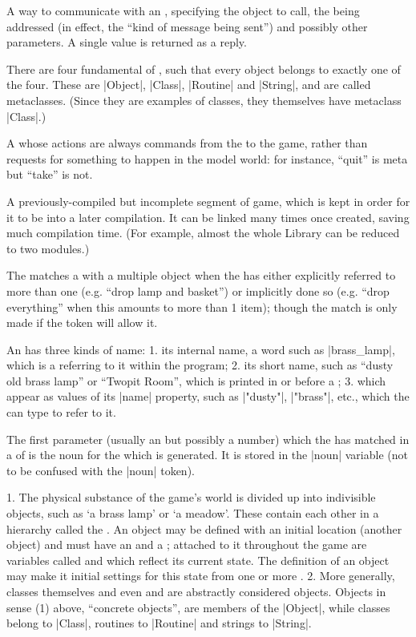 %
A way to communicate with an , specifying the object to call,
the  being addressed (in effect, the ``kind of message being
sent'') and possibly other parameters.  A single value is returned as
a reply.

%
There are four fundamental  of , such that every object
belongs to exactly one of the four.  These are |Object|, |Class|, |Routine|
and |String|, and are called metaclasses.  (Since they are examples of
classes, they themselves have metaclass |Class|.)

%
A  whose actions are always commands from the  to the game,
rather than requests for something to happen in the model world: for
instance, ``quit'' is meta but ``take'' is not.

%
A previously-compiled but incomplete segment of game, which is kept in
order for it to be  into a later compilation.  It can be
linked many times once created, saving much compilation time.  (For
example, almost the whole Library can be reduced to two modules.)

%
The  matches a  with a multiple object when the 
has either explicitly referred to more than one  (e.g. ``drop
lamp and basket'') or implicitly done so (e.g. ``drop everything'' when
this amounts to more than 1 item); though the match is only made if the
token will allow it.

%
An  has three kinds of name: 1. its internal name, a word such
as |brass_lamp|, which is a  referring to it within the program;
2. its short name, such as ``dusty old brass lamp'' or ``Twopit Room'',
which is printed in  or before a ; 3.
 which appear as values of its |name| property, such
as |"dusty"|, |"brass"|, etc., which the  can type to refer to it.

%
The first parameter (usually an  but possibly a number) which
the  has matched in a  of  is the noun for
the  which is generated.  It is stored in the |noun| variable
(not to be confused with the |noun| token).

%
1. The physical substance of the game's world is divided up into indivisible
objects, such as `a brass lamp' or `a meadow'.  These contain each other
in a hierarchy called the .  An object may be defined with an
initial location (another object) and must have an  and
a ; attached to it throughout the game are variables called
 and  which reflect its current state.  The
definition of an object may make it  initial settings for this
state from one or more .  2. More generally, classes themselves
and even  and  are abstractly considered objects.
Objects in sense (1) above, ``concrete objects'', are members of the
 |Object|, while classes belong to |Class|, routines to
|Routine| and strings to |String|.


